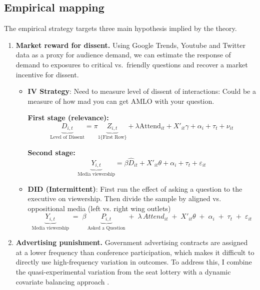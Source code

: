 \documentclass[12pt]{article}
\begin{document}
\subsection{Empirical mapping}

The empirical strategy targets three main hypothesis implied by the theory.

\begin{enumerate}[leftmargin=1.2em]
\item \textbf{Market reward for dissent.} Using Google Trends, Youtube and Twitter data as a proxy for audience demand, we can estimate the response of demand to exposures to critical vs.\ friendly questions and recover a market incentive for dissent. 

\begin{itemize}
    \item \textbf{IV Strategy}: Need to measure level of dissent of interactions: Could be a measure of how mad you can get AMLO with your question.

\textbf{First stage (relevance):}
\[
\underbrace{D_{i,t}}_{\text{Level of Dissent}} = \pi \underbrace{ Z_{i,t}}_{\text{1\{First Row\}}} + \lambda \text{Attend}_{it} + X'_{it}\gamma + \alpha_i + \tau_t + \nu_{it}
\]

\textbf{Second stage:}
\[
\underbrace{ Y_{i,t}}_{\text{Media viewership}} = \beta \widehat{D}_{it} + X'_{it}\theta + \alpha_i + \tau_t + \varepsilon_{it}
\]
\end{itemize}

\vspace{0.5em}

\begin{itemize}
    \item \textbf{DID (Intermittent)}: First run the effect of asking a question to the executive on viewership. Then divide the sample by aligned vs. oppositional media (left vs. right wing outlets)
\[
\underbrace{ Y_{i,t}}_{\text{Media viewership}}
\;=\;
\beta\,\underbrace{ P_{i,t}}_{\text{Asked a Question}}
\;+\;
\lambda\,\textit{Attend}_{it}
\;+\;
X'_{it}\theta
\;+\;
\alpha_i
\;+\;
\tau_t
\;+\;
\varepsilon_{it}
\]
\end{itemize}

\vspace{0.5em}

\item \textbf{Advertising punishment.} Government advertising contracts are assigned at a lower frequency than conference participation, which makes it difficult to directly use high-frequency variation in outcomes. To address this, I combine the quasi-experimental variation from the seat lottery with a dynamic covariate balancing approach \citep{VivianoDynamic}.


\end{enumerate}
\end{document}
